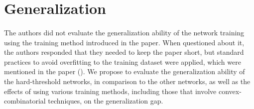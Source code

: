 \section{Generalization}\label{generalization}
\paragraph{}

The authors did not evaluate the generalization ability of the network training using the training method introduced in the paper. When questioned about it, the authors responded that they needed to keep the paper short, but standard practices to avoid overfitting to the training dataset were applied, which were mentioned in the paper (\cite{FriesenReview}). We propose to evaluate the generalization ability of the hard-threshold networks, in comparison to the other networks, as well as the effects of using various training methods, including those that involve convex-combinatorial techniques, on the generalization gap.  